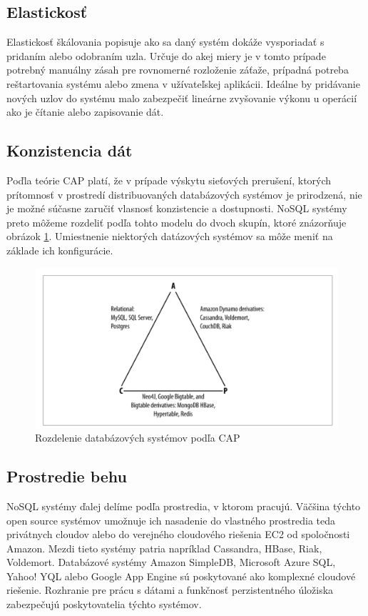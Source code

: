 \documentclass[11pt,twoside,a4paper]{book}
\begin{document}
\subsection{Elastickosť}
Elastickosť škálovania popisuje ako sa daný systém dokáže vysporiadať s pridaním alebo odobraním uzla. Určuje do akej miery je v tomto prípade potrebný manuálny zásah pre rovnomerné rozloženie záťaže, prípadná potreba reštartovania systému alebo zmena v užívateľskej aplikácii. Ideálne by pridávanie nových uzlov do systému malo zabezpečiť lineárne zvyšovanie výkonu u operácií ako je čítanie alebo zapisovanie dát.


\subsection{Konzistencia dát}
Poďla teórie CAP platí, že v prípade výskytu sieťových prerušení, ktorých prítomnosť v prostredí distribuovaných databázových systémov je prirodzená, nie je možné súčasne zaručiť vlasnosť konzistencie a dostupnosti. NoSQL systémy preto môžeme rozdeliť podľa tohto modelu do dvoch skupín, ktoré znázorňuje obrázok \ref{fig:scalling}. Umiestnenie niektorých datázových systémov sa môže meniť na základe ich konfigurácie. 

\begin{figure}[h]
 \centering
 \includegraphics[width=13cm]{./figures/capDatabases.png}
 \caption{Rozdelenie databázových systémov podľa CAP}
 \label{fig:scalling}
\end{figure}


\subsection{Prostredie behu}
NoSQL systémy ďalej delíme  podľa prostredia, v ktorom pracujú. Väčšina týchto open source systémov umožnuje ich nasadenie do vlastného prostredia teda privátnych cloudov alebo do verejného cloudového riešenia EC2 od spoločnosti Amazon. Mezdi tieto systémy patria napríklad Cassandra, HBase, Riak, Voldemort. Databázové systémy Amazon SimpleDB, Microsoft Azure SQL, Yahoo! YQL alebo Google App Engine sú poskytované ako komplexné cloudové riešenie. Rozhranie pre prácu s dátami a funkčnosť perzistentného úložiska zabezpečujú poskytovatelia týchto systémov.
\end{document}
